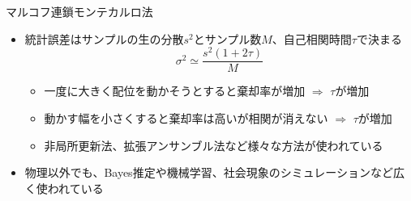 \documentclass[dvipdfmx]{beamer}
\begin{document}
\begin{frame}[t,fragile]{マルコフ連鎖モンテカルロ法}
  \begin{itemize}
    \setlength{\itemsep}{1em}
  \item 統計誤差はサンプルの生の分散$s^2$とサンプル数$M$、自己相関時間$\tau$で決まる
    \[
    \sigma^2 \simeq \frac{s^2 (1+2\tau)}{M}
    \]
    \begin{itemize}
    \item 一度に大きく配位を動かそうとすると棄却率が増加 $\Rightarrow$ $\tau$が増加
    \item 動かす幅を小さくすると棄却率は高いが相関が消えない $\Rightarrow$ $\tau$が増加
    \item 非局所更新法、拡張アンサンブル法など様々な方法が使われている
    \end{itemize}
  \item 物理以外でも、Bayes推定や機械学習、社会現象のシミュレーションなど広く使われている
  \end{itemize}
\end{frame}
\end{document}
